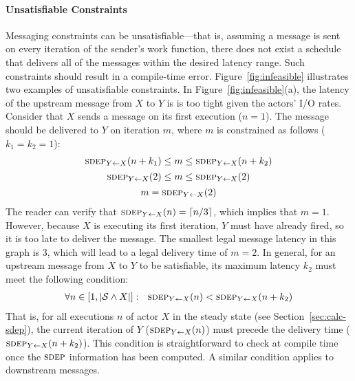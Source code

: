 \documentclass{sig-alternate}
\begin{document}
\paragraph*{Unsatisfiable Constraints}  
Messaging constraints can be unsatisfiable---that is, assuming a
message is sent on every iteration of the sender's work function,
there does not exist a schedule that delivers all of the messages
within the desired latency range.  Such constraints should result in a
compile-time error.  Figure~\ref{fig:infeasible} illustrates two
examples of unsatisfiable constraints.  In
Figure~\ref{fig:infeasible}(a), the latency of the upstream message
from $X$ to $Y$ is is too tight given the actors' I/O rates.  Consider
that $X$ sends a message on its first execution ($n=1$).  The message
should be delivered to $Y$ on iteration $m$, where $m$ is constrained
as follows ($k_1 = k_2 = 1$):
\begin{equation*}
\begin{array}{c}
\sdepf{Y}{X}(n+k_1) \le m \le \sdepf{Y}{X}(n+k_2) \\[1Ex]
\sdepf{Y}{X}(2) \le m \le \sdepf{Y}{X}(2) \\[1Ex]
m = \sdepf{Y}{X}(2)
\end{array}
\vspace{-4pt}
\end{equation*}
The reader can verify that $\sdepf{Y}{X}(n) = \lceil n/3 \rceil$,
which implies that $m=1$.  However, because $X$ is executing its first
iteration, $Y$ must have already fired, so it is too late to deliver
the message.  The smallest legal message latency in this graph is 3,
which will lead to a legal delivery time of $m=2$.  In general, for an
upstream message from $X$ to $Y$ to be satisfiable, its maximum
latency $k_2$ must meet the following condition:
\begin{equation*}
\begin{array}{c}
\forall n \in [1, |{\cal S} \wedge X|]:~~\sdepf{Y}{X}(n) < \sdepf{Y}{X}(n+k_2)
\end{array}
\end{equation*}
That is, for all executions $n$ of actor $X$ in the steady state (see
Section~\ref{sec:calc-sdep}), the current iteration of $Y$
($\sdepf{Y}{X}(n)$) must precede the delivery time
($\sdepf{Y}{X}(n+k_2)$).  This condition is straightforward to check
at compile time once the $\textsc{sdep}$ information has been computed.  A
similar condition applies to downstream messages.
\end{document}
